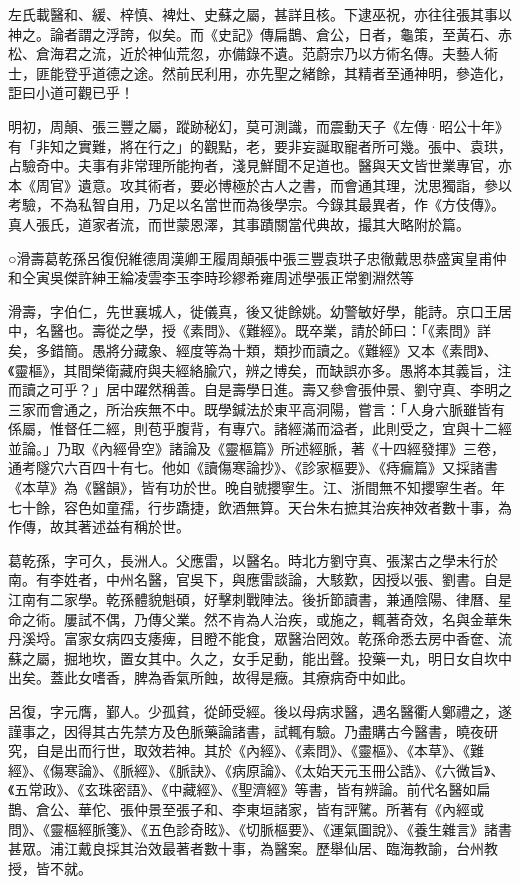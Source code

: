 
\begin{pinyinscope}
左氏載醫和、緩、梓慎、裨灶、史蘇之屬，甚詳且核。下逮巫祝，亦往往張其事以神之。論者謂之浮誇，似矣。而《史記》傳扁鵲、倉公，日者，龜策，至黃石、赤松、倉海君之流，近於神仙荒忽，亦備錄不遺。范蔚宗乃以方術名傳。夫藝人術士，匪能登乎道德之途。然前民利用，亦先聖之緒餘，其精者至通神明，參造化，詎曰小道可觀已乎！

明初，周顛、張三豐之屬，蹤跡秘幻，莫可測識，而震動天子《左傳·昭公十年》有「非知之實難，將在行之」的觀點，老，要非妄誕取寵者所可幾。張中、袁珙，占驗奇中。夫事有非常理所能拘者，淺見鮮聞不足道也。醫與天文皆世業專官，亦本《周官》遺意。攻其術者，要必博極於古人之書，而會通其理，沈思獨詣，參以考驗，不為私智自用，乃足以名當世而為後學宗。今錄其最異者，作《方伎傳》。真人張氏，道家者流，而世蒙恩澤，其事蹟關當代典故，撮其大略附於篇。

○滑壽葛乾孫呂復倪維德周漢卿王履周顛張中張三豐袁珙子忠徹戴思恭盛寅皇甫仲和仝寅吳傑許紳王綸凌雲李玉李時珍繆希雍周述學張正常劉淵然等

滑壽，字伯仁，先世襄城人，徙儀真，後又徙餘姚。幼警敏好學，能詩。京口王居中，名醫也。壽從之學，授《素問》、《難經》。既卒業，請於師曰：「《素問》詳矣，多錯簡。愚將分藏象、經度等為十類，類抄而讀之。《難經》又本《素問》、《靈樞》，其間榮衛藏府與夫經絡腧穴，辨之博矣，而缺誤亦多。愚將本其義旨，注而讀之可乎？」居中躍然稱善。自是壽學日進。壽又參會張仲景、劉守真、李明之三家而會通之，所治疾無不中。既學鍼法於東平高洞陽，嘗言：「人身六脈雖皆有係屬，惟督任二經，則苞乎腹背，有專穴。諸經滿而溢者，此則受之，宜與十二經並論。」乃取《內經骨空》諸論及《靈樞篇》所述經脈，著《十四經發揮》三卷，通考隧穴六百四十有七。他如《讀傷寒論抄》、《診家樞要》、《痔瘺篇》又採諸書《本草》為《醫韻》，皆有功於世。晚自號攖寧生。江、浙間無不知攖寧生者。年七十餘，容色如童孺，行步蹻捷，飲酒無算。天台朱右摭其治疾神效者數十事，為作傳，故其著述益有稱於世。

葛乾孫，字可久，長洲人。父應雷，以醫名。時北方劉守真、張潔古之學未行於南。有李姓者，中州名醫，官吳下，與應雷談論，大駭歎，因授以張、劉書。自是江南有二家學。乾孫體貌魁碩，好擊刺戰陣法。後折節讀書，兼通陰陽、律曆、星命之術。屢試不偶，乃傳父業。然不肯為人治疾，或施之，輒著奇效，名與金華朱丹溪埒。富家女病四支痿痺，目瞪不能食，眾醫治罔效。乾孫命悉去房中香奩、流蘇之屬，掘地坎，置女其中。久之，女手足動，能出聲。投藥一丸，明日女自坎中出矣。蓋此女嗜香，脾為香氣所蝕，故得是癥。其療病奇中如此。

呂復，字元膺，鄞人。少孤貧，從師受經。後以母病求醫，遇名醫衢人鄭禮之，遂謹事之，因得其古先禁方及色脈藥論諸書，試輒有驗。乃盡購古今醫書，曉夜研究，自是出而行世，取效若神。其於《內經》、《素問》、《靈樞》、《本草》、《難經》、《傷寒論》、《脈經》、《脈訣》、《病原論》、《太始天元玉冊公誥》、《六微旨》、《五常政》、《玄珠密語》、《中藏經》、《聖濟經》等書，皆有辨論。前代名醫如扁鵲、倉公、華佗、張仲景至張子和、李東垣諸家，皆有評騭。所著有《內經或問》、《靈樞經脈箋》、《五色診奇眩》、《切脈樞要》、《運氣圖說》、《養生雜言》諸書甚眾。浦江戴良採其治效最著者數十事，為醫案。歷舉仙居、臨海教諭，台州教授，皆不就。


\end{pinyinscope}
